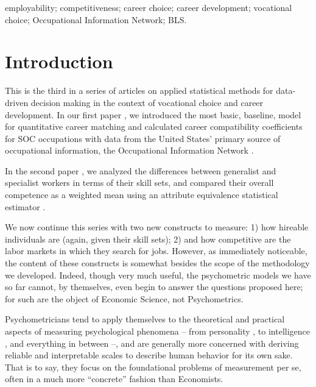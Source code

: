 \documentclass[hidelinks, nonatbib]{elsarticle}
\begin{document}
\begin{keyword}
    employability;
    competitiveness;
    career choice;
    career development;
    vocational choice;
    Occupational Information Network;
    BLS.
\end{keyword}


\maketitle


\tableofcontents


\newpage
\section{Introduction}
This is the third in a series of articles on applied statistical methods for data-driven decision making in the context of vocational choice and career development. In our first paper \parencite{cao_intro_match}, we introduced the most basic, baseline, model for quantitative career matching \parencite[][]{repo_intro_career_matching, atlas.match} and calculated career compatibility coefficients for SOC occupations \parencite[see][]{bls2018soc} with data from the United States' primary source of occupational information, the Occupational Information Network \parencite{onet2024about}.

In the second  paper \parencite{cao_gene_comp}, we analyzed the differences between generalist and specialist workers in terms of their skill sets, and compared their overall competence as a weighted mean using an attribute equivalence statistical estimator \parencite[see][]{atlas.aeq,atlas.gene,atlas.comp, repo_gene_comp}.

We now continue this series with two new constructs to measure: 1) how hireable individuals are (again, given their skill sets); 2) and how competitive are the labor markets in which they search for jobs. However, as immediately noticeable, the content of these constructs is somewhat besides the scope of the methodology we developed. Indeed, though very much useful, the psychometric models we have so far cannot, by themselves, even begin to answer the questions proposed here; for such are the object of Economic Science, not Psychometrics.

Psychometricians tend to apply themselves to the theoretical and practical aspects of measuring psychological phenomena -- from personality \parencite[e.g.][]{epi,bigfive}, to intelligence \parencite[e.g.][]{stanford_binet5,wisc5}, and everything in between \parencite[e.g.][]{mmpi3,holland1997making,schein1993careeranchors} --, and are generally more concerned with deriving reliable and interpretable scales to describe human behavior for its own sake. That is to say, they focus on the foundational problems of measurement per se, often in a much more ``concrete'' fashion than Economists.
\end{document}
